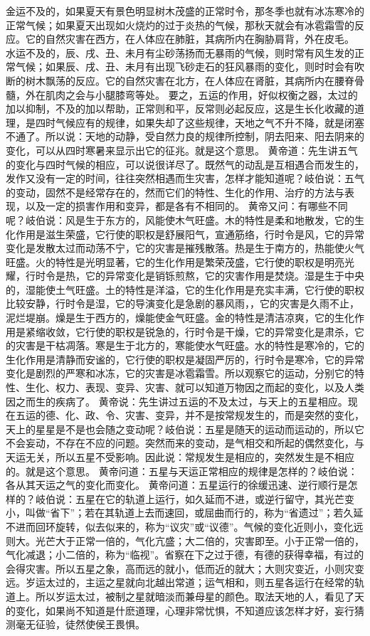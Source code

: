 \documentclass[a4paper,12pt,UTF8,twoside]{ctexbook}
\begin{document}
金运不及的，如果夏天有景色明显树木茂盛的正常时令，那冬季也就有冰冻寒冷的正常气候；如果夏天出现如火烧灼的过于炎热的气候，那秋天就会有冰雹霜雪的反应。它的自然灾害在西方，在人体应在肺脏，其病所内在胸胁肩背，外在皮毛。
水运不及的，辰、戌、丑、未月有尘砂荡扬而无暴雨的气候，则时常有风生发的正常气候；如果辰、戌、丑、未月有出现飞砂走石的狂风暴雨的变化，则时时会有吹断的树木飘荡的反应。它的自然灾害在北方，在人体应在肾脏，其病所内在腰脊骨髓，外在肌肉之会与小腿膝弯等处。
要之，五运的作用，好似权衡之器，太过的加以抑制，不及的加以帮助，正常则和平，反常则必起反应，这是生长化收藏的道理，是四时气候应有的规律，如果失却了这些规律，天地之气不升不降，就是闭塞不通了。所以说：天地的动静，受自然力良的规律所控制，阴去阳来、阳去阴来的变化，可以从四时寒暑来显示出它的征兆。就是这个意思。
黄帝道：先生讲五气的变化与四时气候的相应，可以说很详尽了。既然气的动乱是互相遇合而发生的，发作又没有一定的时间，往往突然相遇而生灾害，怎样才能知道呢？岐伯说：五气的变动，固然不是经常存在的，然而它们的特性、生化的作用、治疗的方法与表现，以及一定的损害作用和变异，都是各有不相同的。
黄帝又问：有哪些不同呢？岐伯说：风是生于东方的，风能使木气旺盛。木的特性是柔和地散发，它的生化作用是滋生荣盛，它行使的职权是舒展阳气，宣通筋络，行时令是风，它的异常变化是发散太过而动荡不宁，它的灾害是摧残散落。热是生于南方的，热能使火气旺盛。火的特性是光明显著，它的生化作用是繁荣茂盛，它行使的职权是明亮光耀，行时令是热，它的异常变化是销铄煎熬，它的灾害作用是焚烧。湿是生于中央的，湿能使土气旺盛。土的特性是洋溢，它的生化作用是充实丰满，它行使的职权比较安静，行时令是湿，它的导演变化是急剧的暴风雨，，它的灾害是久雨不止，泥烂堤崩。燥是生于西方的，燥能使金气旺盛。金的特性是清洁凉爽，它的生化作用是紧缩收敛，它行使的职权是锐急的，行时令是干燥，它的异常变化是肃杀，它的灾害是干枯凋落。寒是生于北方的，寒能使水气旺盛。水的特性是寒冷的，它的生化作用是清静而安谧的，它行使的职权是凝固严厉的，行时令是寒冷，它的异常变化是剧烈的严寒和冰冻，它的灾害是冰雹霜雪。所以观察它的运动，分别它的特性、生化、权力、表现、变异、灾害、就可以知道万物因之而起的变化，以及人类因之而生的疾病了。
黄帝说：先生讲过五运的不及太过，与天上的五星相应。现在五运的德、化、政、令、灾害、变异，并不是按常规发生的，而是突然的变化，天上的星星是不是也会随之变动呢？岐伯说：五星是随天的运动而运动的，所以它不会妄动，不存在不应的问题。突然而来的变动，是气相交和所起的偶然变化，与天运无关，所以五星不受影响。因此说：常规发生是相应的，突然发生是不相应的。就是这个意思。
黄帝问道：五星与天运正常相应的规律是怎样的？岐伯说：各从其天运之气的变化而变化。
黄帝问道：五星运行的徐缓迅速、逆行顺行是怎样的？岐伯说：五星在它的轨道上运行，如久延而不进，或逆行留守，其光芒变小，叫做“省下”；若在其轨道上去而速回，或屈曲而行的，称为“省遗过”；若久延不进而回环旋转，似去似来的，称为“议灾”或“议德”。气候的变化近则小，变化远则大。光芒大于正常一倍的，气化亢盛；大二倍的，灾害即至。小于正常一倍的，气化减退；小二倍的，称为“临视”。省察在下之过于德，有德的获得幸福，有过的会得灾害。所以五星之象，高而远的就小，低而近的就大；大则灾变近，小则灾变远。岁运太过的，主运之星就向北越出常道；运气相和，则五星各运行在经常的轨道上。所以岁运太过，被制之星就暗淡而兼母星的颜色。取法天地的人，看见了天的变化，如果尚不知道是什麽道理，心理非常忧惧，不知道应该怎样才好，妄行猜测毫无征验，徒然使侯王畏惧。
\end{document}
